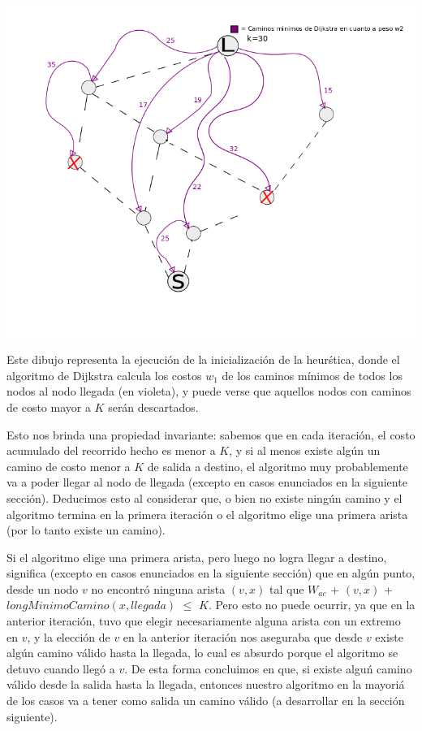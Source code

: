 \begin{center}
\includegraphics[scale=0.58]{img/inicializacion.png}
\end{center}
\vspace{2mm}

Este dibujo representa la ejecuci\'on de la inicializaci\'on de la heur\'stica, donde el algoritmo de Dijkstra calcula los costos $w_1$ de los caminos m\'inimos de todos los nodos al nodo llegada (en violeta), y puede verse que aquellos nodos con caminos de costo mayor a $K$ ser\'an descartados.

\vspace{10mm}

Esto nos brinda una propiedad invariante: sabemos que en cada iteraci\'on, el costo acumulado del recorrido hecho es menor a $K$, y si al menos existe alg\'un un camino de costo menor a $K$ de salida a destino, el algoritmo muy probablemente va a poder llegar al nodo de llegada (excepto en casos enunciados en la siguiente secci\'on). Deducimos esto al considerar que, o bien no existe ning\'un camino y  el algoritmo termina en la primera iteraci\'on o el algoritmo elige una primera arista (por lo tanto existe un camino). 

\vspace{2mm}

Si el algoritmo elige una primera arista, pero luego no logra llegar a destino, significa (excepto en casos enunciados en la siguiente secci\'on) que en alg\'un punto, desde un nodo $v$ no encontr\'o ninguna arista $(v,x)$ tal que $W_{ac}$ + $(v,x)$ + $longMinimoCamino(x, llegada)$ $\leq$ $K$. Pero esto no puede ocurrir, ya que en la anterior iteraci\'on, tuvo que elegir necesariamente alguna arista con un extremo en $v$, y la elecci\'on de $v$ en la anterior iteraci\'on nos aseguraba que desde $v$ existe alg\'un camino v\'alido hasta la llegada, lo cual es absurdo porque el algoritmo se detuvo cuando lleg\'o a $v$. De esta forma concluimos en que, si existe algu\'n camino v\'alido desde la salida hasta la llegada, entonces nuestro algoritmo en la mayori\'a de los casos va a tener como salida un camino v\'alido (a desarrollar en la secci\'on siguiente).

